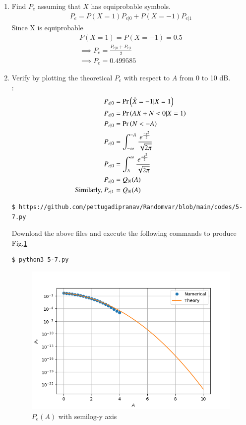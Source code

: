 \documentclass[journal,12pt,twocolumn]{IEEEtran}
\renewcommand\thesection{\arabic{section}}
\begin{document}
\begin{enumerate}[label=\thesection.\arabic*
,ref=\thesection.\theenumi]
		\item Find $P_e$ assuming that $X$ has equiprobable symbols.\\
\solution
\begin{align}
    P_e=P(X=1)P_{e|0}+P(X=-1)P_{e|1}
\end{align}
Since X is equiprobable
\begin{align}
    P(X=1)=P(X=-1)=0.5\\
    \implies P_e=\frac{P_{e|0}+P_{e|1}}{2}\\
    \implies \boxed{P_e=0.499585}
\end{align}

\item
Verify by plotting  the theoretical $P_e$ with respect to $A$ from 0 to 10 dB.  \\
\solution:
\begin{align}
    P_{e|0}&=\Pr\left(\hat{X}=-1|X=1\right)\\
    P_{e|0}&=\Pr\left(AX+N<0|X=1\right)\\
    P_{e|0}&=\Pr\left(N<-A\right)\\
    P_{e|0}&=\int_{-\infty }^{-A}\frac{e^{\frac{-x^2}{2}}}{\sqrt{2\pi}}\\
    P_{e|0}&=\int_{A }^{\infty}\frac{e^{\frac{-x^2}{2}}}{\sqrt{2\pi}}\\
    P_{e|0}&=Q_N(A)\\
    \text{Similarly, }P_{e|1}&=Q_N(A)
\end{align}
\begin{lstlisting}
$ https://github.com/pettugadipranav/Randomvar/blob/main/codes/5-7.py
\end{lstlisting}
Download the above files and execute the following commands to produce Fig.\ref{fig:5.6}
\begin{lstlisting}
$ python3 5-7.py
\end{lstlisting}
\begin{figure}[!h]
\centering
\includegraphics[width=\columnwidth]{./figs/5-7.png}
\caption{$P_e(A)$ with semilog-y axis}
\label{fig:5.6}
\end{figure}


\end{enumerate}
\end{document}
